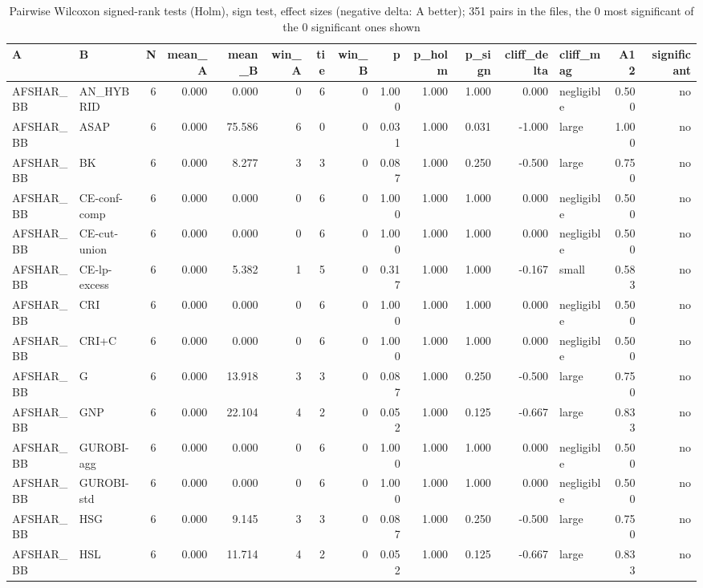 \begin{table}[htbp]
\centering
\small
\caption{Pairwise Wilcoxon signed-rank tests (Holm), sign test, effect sizes (negative delta: A better); 351 pairs in the files, the 0 most significant of the 0 significant ones shown}
\label{tab:E0_sanity_b5_pairwise}
\begin{tabular}{llrrrrrrrrrrlrr}
\toprule
A & B & N & mean\_A & mean\_B & win\_A & tie & win\_B & p & p\_holm & p\_sign & cliff\_delta & cliff\_mag & A12 & significant \\
\midrule
AFSHAR\_BB & AN\_HYBRID & 6 & 0.000 & 0.000 & 0 & 6 & 0 & 1.000 & 1.000 & 1.000 & 0.000 & negligible & 0.500 & no \\
AFSHAR\_BB & ASAP & 6 & 0.000 & 75.586 & 6 & 0 & 0 & 0.031 & 1.000 & 0.031 & -1.000 & large & 1.000 & no \\
AFSHAR\_BB & BK & 6 & 0.000 & 8.277 & 3 & 3 & 0 & 0.087 & 1.000 & 0.250 & -0.500 & large & 0.750 & no \\
AFSHAR\_BB & CE-conf-comp & 6 & 0.000 & 0.000 & 0 & 6 & 0 & 1.000 & 1.000 & 1.000 & 0.000 & negligible & 0.500 & no \\
AFSHAR\_BB & CE-cut-union & 6 & 0.000 & 0.000 & 0 & 6 & 0 & 1.000 & 1.000 & 1.000 & 0.000 & negligible & 0.500 & no \\
AFSHAR\_BB & CE-lp-excess & 6 & 0.000 & 5.382 & 1 & 5 & 0 & 0.317 & 1.000 & 1.000 & -0.167 & small & 0.583 & no \\
AFSHAR\_BB & CRI & 6 & 0.000 & 0.000 & 0 & 6 & 0 & 1.000 & 1.000 & 1.000 & 0.000 & negligible & 0.500 & no \\
AFSHAR\_BB & CRI+C & 6 & 0.000 & 0.000 & 0 & 6 & 0 & 1.000 & 1.000 & 1.000 & 0.000 & negligible & 0.500 & no \\
AFSHAR\_BB & G & 6 & 0.000 & 13.918 & 3 & 3 & 0 & 0.087 & 1.000 & 0.250 & -0.500 & large & 0.750 & no \\
AFSHAR\_BB & GNP & 6 & 0.000 & 22.104 & 4 & 2 & 0 & 0.052 & 1.000 & 0.125 & -0.667 & large & 0.833 & no \\
AFSHAR\_BB & GUROBI-agg & 6 & 0.000 & 0.000 & 0 & 6 & 0 & 1.000 & 1.000 & 1.000 & 0.000 & negligible & 0.500 & no \\
AFSHAR\_BB & GUROBI-std & 6 & 0.000 & 0.000 & 0 & 6 & 0 & 1.000 & 1.000 & 1.000 & 0.000 & negligible & 0.500 & no \\
AFSHAR\_BB & HSG & 6 & 0.000 & 9.145 & 3 & 3 & 0 & 0.087 & 1.000 & 0.250 & -0.500 & large & 0.750 & no \\
AFSHAR\_BB & HSL & 6 & 0.000 & 11.714 & 4 & 2 & 0 & 0.052 & 1.000 & 0.125 & -0.667 & large & 0.833 & no \\

\end{tabular}
\end{table}
